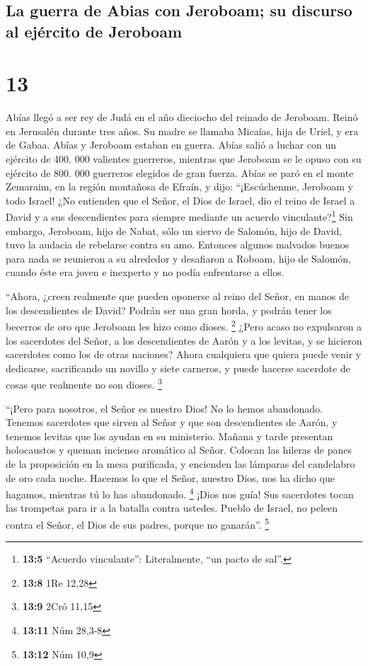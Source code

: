 \hypertarget{la-guerra-de-abias-con-jeroboam-su-discurso-al-ejuxe9rcito-de-jeroboam}{%
\subsection{La guerra de Abias con Jeroboam; su discurso al ejército de
Jeroboam}\label{la-guerra-de-abias-con-jeroboam-su-discurso-al-ejuxe9rcito-de-jeroboam}}

\hypertarget{section-12}{%
\section{13}\label{section-12}}

 Abías llegó a ser rey de Judá en el año dieciocho del
reinado de Jeroboam.  Reinó en Jerusalén durante tres
años. Su madre se llamaba Micaías, hija de Uriel, y era de Gabaa. Abías
y Jeroboam estaban en guerra.  Abías salió a luchar con un
ejército de 400. 000 valientes guerreros, mientras que Jeroboam se le
opuso con su ejército de 800. 000 guerreros elegidos de gran fuerza.
 Abías se paró en el monte Zemaraim, en la región
montañosa de Efraín, y dijo: ``¡Escúchenme, Jeroboam y todo Israel!
 ¿No entienden que el Señor, el Dios de Israel, dio el
reino de Israel a David y a sus descendientes para siempre mediante un
acuerdo vinculante?\footnote{\textbf{13:5} ``Acuerdo vinculante'':
  Literalmente, ``un pacto de sal''.}  Sin embargo,
Jeroboam, hijo de Nabat, sólo un siervo de Salomón, hijo de David, tuvo
la audacia de rebelarse contra su amo.  Entonces algunos
malvados buenos para nada se reunieron a su alrededor y desafiaron a
Roboam, hijo de Salomón, cuando éste era joven e inexperto y no podía
enfrentarse a ellos.

 ``Ahora, ¿creen realmente que pueden oponerse al reino
del Señor, en manos de los descendientes de David? Podrán ser una gran
horda, y podrán tener los becerros de oro que Jeroboam les hizo como
dioses. \footnote{\textbf{13:8} 1Re 12,28}  ¿Pero acaso no
expulsaron a los sacerdotes del Señor, a los descendientes de Aarón y a
los levitas, y se hicieron sacerdotes como los de otras naciones? Ahora
cualquiera que quiera puede venir y dedicarse, sacrificando un novillo y
siete carneros, y puede hacerse sacerdote de cosas que realmente no son
dioses. \footnote{\textbf{13:9} 2Cró 11,15}

 ``¡Pero para nosotros, el Señor es nuestro Dios! No lo
hemos abandonado. Tenemos sacerdotes que sirven al Señor y que son
descendientes de Aarón, y tenemos levitas que los ayudan en su
ministerio.  Mañana y tarde presentan holocaustos y
queman incienso aromático al Señor. Colocan las hileras de panes de la
proposición en la mesa purificada, y encienden las lámparas del
candelabro de oro cada noche. Hacemos lo que el Señor, nuestro Dios, nos
ha dicho que hagamos, mientras tú lo has abandonado. \footnote{\textbf{13:11}
  Núm 28,3-8}  ¡Dios nos guía! Sus sacerdotes tocan las
trompetas para ir a la batalla contra ustedes. Pueblo de Israel, no
peleen contra el Señor, el Dios de sus padres, porque no ganarán''.
\footnote{\textbf{13:12} Núm 10,9}

